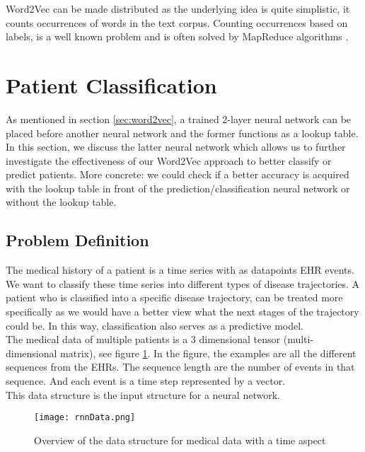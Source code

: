 Word2Vec can be made distributed as the underlying idea is quite simplistic, it counts occurrences of words in the text corpus. Counting occurrences based on labels, is a well known problem and is often solved by MapReduce algorithms \cite{mapreduce:article}.


\section{Patient Classification}
\label{sec:PatientClassification}

As mentioned in section \ref{sec:word2vec}, a trained 2-layer neural network can be placed before another neural network and the former functions as a lookup table. In this section, we discuss the latter neural network which allows us to further investigate the effectiveness of our Word2Vec approach to better classify or predict patients. More concrete: we could check if a better accuracy is acquired with the lookup table in front of the prediction/classification neural network or without the lookup table. 

\subsection{Problem Definition}
\label{sec:problem}

The medical history of a patient is a time series with as datapoints EHR events. We want to classify these time series into different types of disease trajectories. A patient who is classified into a specific disease trajectory, can be treated more specifically as we would have a better view what the next stages of the trajectory could be. In this way, classification also serves as a predictive model. \\

The medical data of multiple patients is a $3$ dimensional tensor (multi-dimensional matrix), see figure \ref{fig:rnnData}. In the figure, the examples are all the different sequences from the EHRs. The sequence length are the number of events in that sequence. And each event is a time step represented by a vector. \\
This data structure is the input structure for a neural network. \\

\begin{figure}[!htb]
	\centering
	\texttt{[image: rnnData.png]}
	\caption{Overview of the data structure for medical data with a time aspect \cite{dl4jRnn:online}}
	\label{fig:rnnData}
\end{figure} 

